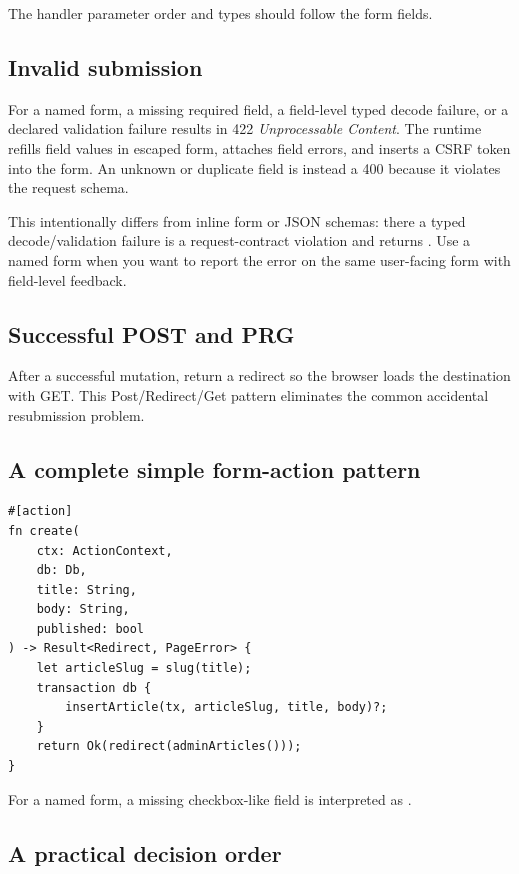 The handler parameter order and types should follow the form fields.

\subsection*{Invalid submission}

For a named form, a missing required field, a field-level typed decode failure, or a declared validation failure results in 422 \emph{Unprocessable Content}. The runtime refills field values in escaped form, attaches field errors, and inserts a CSRF token into the form. An unknown or duplicate field is instead a 400 because it violates the request schema.

This intentionally differs from inline form or JSON schemas: there a typed decode/validation failure is a request-contract violation and returns . Use a named form when you want to report the error on the same user-facing form with field-level feedback.

\subsection*{Successful POST and PRG}

After a successful mutation, return a redirect so the browser loads the destination with GET. This Post/Redirect/Get pattern eliminates the common accidental resubmission problem.

\subsection*{A complete simple form-action pattern}

\begin{lstlisting}[language=Velran]
#[action]
fn create(
    ctx: ActionContext,
    db: Db,
    title: String,
    body: String,
    published: bool
) -> Result<Redirect, PageError> {
    let articleSlug = slug(title);
    transaction db {
        insertArticle(tx, articleSlug, title, body)?;
    }
    return Ok(redirect(adminArticles()));
}
\end{lstlisting}

For a named form, a missing checkbox-like  field is interpreted as .

\subsection*{A practical decision order}

